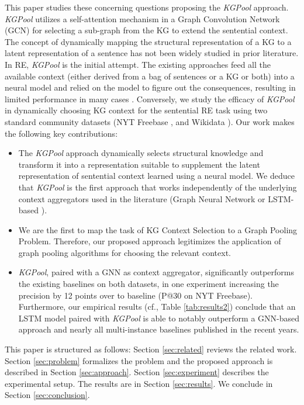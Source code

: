 \documentclass[11pt,a4paper]{article}
\begin{document}
This paper studies these concerning questions
proposing the \textit{KGPool} approach. \textit{KGPool} utilizes a self-attention mechanism in a Graph Convolution Network (GCN) \cite{kipf2016semi} for selecting a sub-graph from the KG to extend the sentential context. The concept of dynamically mapping the structural representation of a KG to a latent representation of a sentence has not been widely studied in prior literature. In RE, \textit{KGPool} is the initial attempt. The existing approaches \cite{bastos2020recon,DBLP:conf/naacl/XuB19,DBLP:conf/aaai/WuFZ19,DBLP:conf/emnlp/VashishthJPBT18} feed all the available context (either derived from a bag of sentences or a KG or both) into a neural model and relied on the model to figure out the consequences, resulting in limited performance in many cases \cite{bastos2020recon}. 
Conversely, we study the efficacy of \textit{KGPool} in dynamically choosing KG context for the sentential RE task using two standard community datasets (NYT Freebase \cite{DBLP:conf/pkdd/RiedelYM10}, and Wikidata \cite{DBLP:conf/emnlp/SorokinG17}). Our work makes the following key contributions:
\begin{itemize}
\itemsep-.4em 
  \item The \textit{KGPool} approach dynamically selects structural knowledge and transform it into a representation suitable to supplement the latent representation of sentential context learned using a neural model. We deduce that \textit{KGPool} is the first approach that works independently of the underlying context aggregators used in the literature (Graph Neural Network \cite{DBLP:conf/acl/ZhuLLFCS19} or LSTM-based \cite{DBLP:conf/emnlp/SorokinG17}).
  \item We are the first to map the task of KG Context Selection to a Graph Pooling Problem. Therefore, our proposed approach legitimizes the application of graph pooling algorithms for choosing the relevant context. 
  \item \textit{KGPool}, paired with a GNN as context aggregator, significantly outperforms the existing baselines on both datasets, in one experiment increasing the precision by 12 points over to baseline (P@30 on NYT Freebase). Furthermore, our empirical results (cf., Table \ref{tab:results2}) conclude that an LSTM model paired with \textit{KGPool} is able to notably outperform a GNN-based approach \cite{DBLP:conf/acl/ZhuLLFCS19} and nearly all multi-instance baselines \cite{DBLP:conf/naacl/YeL19,DBLP:conf/aaai/WuFZ19,DBLP:conf/emnlp/VashishthJPBT18} published in the recent years. 
\end{itemize}
This paper is structured as follows: Section \ref{sec:related} reviews the related work. Section \ref{sec:problem} formalizes the problem and the proposed approach is described in Section \ref{sec:approach}. Section \ref{sec:experiment} describes the experimental setup. The results are in Section \ref{sec:results}. We conclude in Section \ref{sec:conclusion}.
\end{document}
